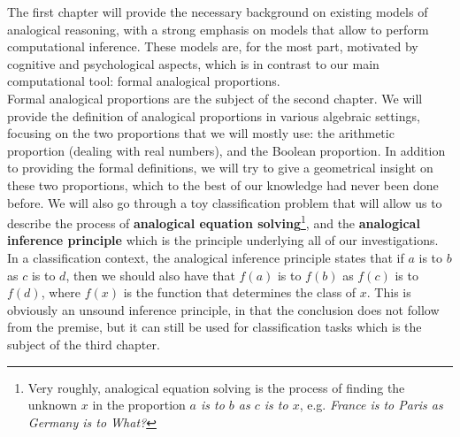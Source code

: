 The first chapter will provide the necessary background on existing
models of analogical reasoning, with a strong emphasis on models that allow to
perform computational inference. These models are, for the most part, motivated
by cognitive and psychological aspects, which is in contrast to our main
computational tool: formal analogical proportions.\\

Formal analogical proportions are the subject of the second chapter. We will
provide the definition of analogical proportions in various algebraic settings,
focusing on the two proportions that we will mostly use: the arithmetic
proportion (dealing with real numbers), and the Boolean proportion. In addition
to providing the formal definitions, we will try to give a geometrical insight
on these two proportions, which to the best of our knowledge had never been
done before. We will also go through a toy classification problem that will
allow us to describe the process of \textbf{analogical equation
solving}\footnote{Very roughly, analogical equation solving is the process of
finding the unknown $x$ in the proportion \textit{$a$ is to $b$ as $c$ is to
$x$}, e.g. \textit{France is to Paris as Germany is to What?}}, and the \textbf{analogical inference principle} which is the principle
underlying all of our investigations. In a classification context, the
analogical inference principle states that if $a$ is to $b$ as $c$ is to $d$,
then we should also have that $f(a)$ is to $f(b)$ as $f(c)$ is to $f(d)$, where
$f(x)$ is the function that determines the class of $x$. This is obviously an
unsound inference principle, in that the conclusion does not follow from the
premise, but it can still be used for classification tasks which is the subject
of the third chapter.\\

